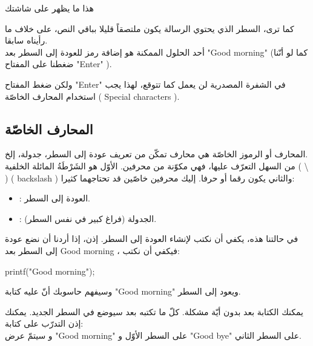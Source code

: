 هذا ما يظهر على شاشتك

كما ترى، السطر الذي يحتوي الرسالة يكون ملتصقاً قليلا بباقي النص، على خلاف ما رأيناه سابقا.\\
أحد الحلول الممكنة هو إضافة رمز للعودة إلى السطر بعد
 "\textenglish{Good morning}"
 (كما لو أنّنا ضغطنا على المفتاح
"\textenglish{Enter}"
).

ولكن ضغط المفتاح
"\textenglish{Enter}"
 في الشفرة المصدرية لن يعمل كما تتوقع، لهذا يجب استخدام المحارف الخاصّة (
\textenglish{Special characters}
).

\subsection{المحارف الخاصّة}
المحارف أو الرموز الخاصّة هي محارف تمكّن من تعريف عودة إلى السطر، جدولة، إلخ.\\
من السهل التعرّف عليها، فهي مكوّنة من محرفين. الأوّل هو الشَرْطَةُ المائلة الخلفية (
\textbackslash
) (
\textenglish{backslash}
) والثاني يكون رقما أو حرفا. إليك محرفين خاصّين قد تحتاجهما كثيرا:
\begin{itemize}
  \item {}:
 العودة إلى السطر.
 \item {}:
 الجدولة (فراغ كبير في نفس السطر).
\end{itemize}

في حالتنا هذه، يكفي أن نكتب
 لإنشاء العودة إلى السطر. إذن، إذا أردنا أن نضع عودة إلى السطر بعد
\textenglish{Good morning}
، فيكفي أن نكتب:
\begin{Csource}
printf("Good morning\n");
\end{Csource}

وسيفهم حاسوبك أنّ عليه كتابة
"\textenglish{Good morning}"
 ويعود إلى السطر.

\begin{information}
  يمكنك الكتابة بعد
بدون أيّة مشكلة. كلّ ما تكتبه بعد
 سيوضع في السطر الجديد. يمكنك إذن التدرّب على كتابة:
\\
و سيتمّ عرض
"\textenglish{Good morning}"
على السطر الأوّل و
"\textenglish{Good bye}"
على السطر الثاني.
\end{information}
